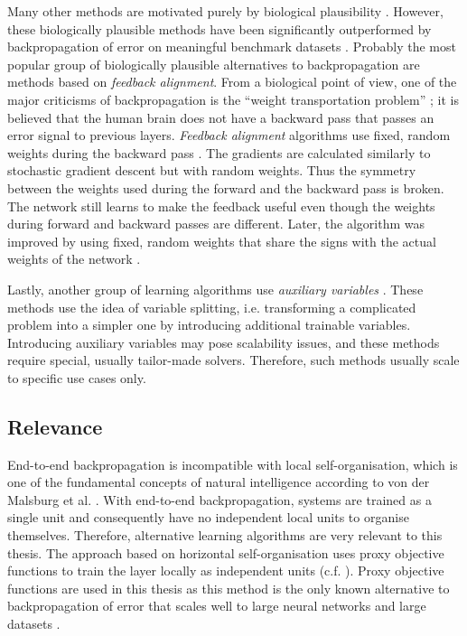 Many other methods are motivated purely by biological plausibility .
However, these biologically plausible methods have been significantly outperformed by backpropagation of error on meaningful benchmark datasets .
Probably the most popular group of biologically plausible alternatives to backpropagation are methods based on \emph{feedback alignment}.
From a biological point of view, one of the major criticisms of backpropagation is the ``weight transportation problem'' ; it is believed that the human brain does not have a backward pass that passes an error signal to previous layers.
\emph{Feedback alignment} algorithms use fixed, random weights during the backward pass .
The gradients are calculated similarly to stochastic gradient descent but with random weights.
Thus the symmetry between the weights used during the forward and the backward pass is broken.
The network still learns to make the feedback useful even though the weights during forward and backward passes are different. 
Later, the algorithm was improved by using fixed, random weights that share the signs with the actual weights of the network .

Lastly, another group of learning algorithms use \emph{auxiliary variables} .
These methods use the idea of variable splitting, i.e. transforming a complicated problem into a simpler one by introducing additional trainable variables.
Introducing auxiliary variables may pose scalability issues, and these methods require special, usually tailor-made solvers.
Therefore, such methods usually scale to specific use cases only.

\subsection{Relevance}
End-to-end backpropagation is incompatible with local self-organisation, which is one of the fundamental concepts of natural intelligence according to von der Malsburg et al. .
With end-to-end backpropagation, systems are trained as a single unit and consequently have no independent local units to organise themselves.
Therefore, alternative learning algorithms are very relevant to this thesis.
The approach based on horizontal self-organisation uses proxy objective functions to train the layer locally as independent units (c.f. ).
Proxy objective functions are used in this thesis as this method is the only known alternative to backpropagation of error that scales well to large neural networks and large datasets .

